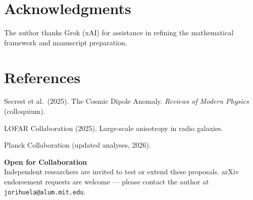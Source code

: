 \documentclass[11pt,a4paper]{article}
\begin{document}
\section*{Acknowledgments}
The author thanks Grok (xAI) for assistance in refining the mathematical framework and manuscript preparation.

\section*{References}
\begin{enumerate}[leftmargin=*,label={[\arabic*]}]
    \item Secrest et al.\ (2025). The Cosmic Dipole Anomaly. \textit{Reviews of Modern Physics} (colloquium).
    \item LOFAR Collaboration (2025). Large-scale anisotropy in radio galaxies.
    \item Planck Collaboration (updated analyses, 2026).
\end{enumerate}

\vspace{2em}
\footnotesize
\noindent \textbf{Open for Collaboration} \\
Independent researchers are invited to test or extend these proposals. arXiv endorsement requests are welcome — please contact the author at \texttt{jorihuela@alum.mit.edu}.
\end{document}
